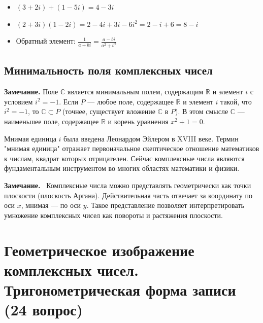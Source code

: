 \documentclass[a4paper,12pt]{article}
\newcommand{\myremark}{\textbf{Замечание.}\ }
\theoremstyle{definition}
\theoremstyle{plain}
\theoremstyle{remark}
\begin{document}
	\begin{tcolorbox}[colback=gray!5, colframe=gray!50, title=Примеры]
		\begin{itemize}
			\item $(3 + 2i) + (1 - 5i) = 4 - 3i$
			\item $(2 + 3i)(1 - 2i) = 2 - 4i + 3i - 6i^2 = 2 - i + 6 = 8 - i$
			\item Обратный элемент: $\frac{1}{a+bi} = \frac{a-bi}{a^2+b^2}$
		\end{itemize}
	\end{tcolorbox}
	
	\subsection{Минимальность поля комплексных чисел}
	
	\noindent \textbf{Замечание.} Поле $\mathbb{C}$ является минимальным полем, содержащим $\mathbb{R}$ и элемент $i$ с условием $i^2 = -1$. Если $P$ — любое поле, содержащее $\mathbb{R}$ и элемент $i$ такой, что $i^2 = -1$, то $\mathbb{C} \subset P$ (точнее, существует вложение $\mathbb{C}$ в $P$). В этом смысле $\mathbb{C}$ — наименьшее поле, содержащее $\mathbb{R}$ и корень уравнения $x^2 + 1 = 0$.
	
	\begin{tcolorbox}[colback=purple!5, colframe=purple!50!black, title=Заметочка: История]
		Мнимая единица $i$ была введена Леонардом Эйлером в XVIII веке. Термин "мнимая единица" отражает первоначальное скептическое отношение математиков к числам, квадрат которых отрицателен. Сейчас комплексные числа являются фундаментальным инструментом во многих областях математики и физики.
	\end{tcolorbox}
	
	\myremark
	Комплексные числа можно представлять геометрически как точки плоскости (плоскость Аргана). Действительная часть отвечает за координату по оси $x$, мнимая — по оси $y$. Такое представление позволяет интерпретировать умножение комплексных чисел как повороты и растяжения плоскости.
	
	
	
	
	
	
	\newpage
	\section{Геометрическое изображение комплексных чисел. Тригонометрическая форма записи (24 вопрос)}
	
\end{document}
